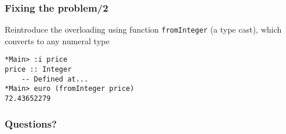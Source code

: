 \documentclass{beamer}
\begin{document}
\begin{frame}[fragile]
  \frametitle{Fixing the problem/2}
  Reintroduce the overloading using function \texttt{fromInteger} (a
  type cast), which converts to any numeral type
\begin{verbatim}
*Main> :i price
price :: Integer
  	-- Defined at...
*Main> euro (fromInteger price)
72.43652279
\end{verbatim}
\end{frame}


\begin{frame}
  \frametitle{Questions?}
  \begin{center}
  \end{center}
\end{frame}
\end{document}
